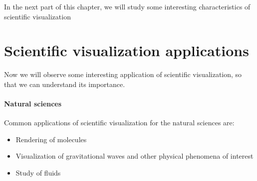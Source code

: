 In the next part of this chapter, we will study some interesting characteristics of scientific visualization

\section{Scientific visualization applications}\label{sec11:Applications}
Now we will observe some interesting application of scientific visualization, so that we can understand its importance.

\paragraph{Natural sciences}
Common applications of scientific visualization for the natural sciences are:
\begin{itemize}
 \item Rendering of molecules
 \item Visualization of gravitational waves and other physical phenomena of interest
 \item Study of fluids
\end{itemize}

